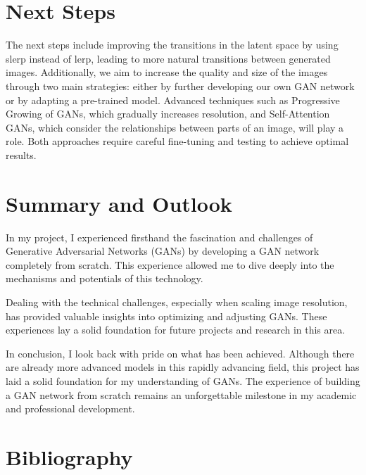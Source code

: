\documentclass[a4paper, 12pt]{article}
\begin{document}
\section{Next Steps}
The next steps include improving the transitions in the latent space by using slerp instead of lerp, leading to more natural transitions between generated images. Additionally, we aim to increase the quality and size of the images through two main strategies: either by further developing our own GAN network or by adapting a pre-trained model. Advanced techniques such as Progressive Growing of GANs, which gradually increases resolution, and Self-Attention GANs, which consider the relationships between parts of an image, will play a role. Both approaches require careful fine-tuning and testing to achieve optimal results.

\section{Summary and Outlook}
In my project, I experienced firsthand the fascination and challenges of Generative Adversarial Networks (GANs) by developing a GAN network completely from scratch. This experience allowed me to dive deeply into the mechanisms and potentials of this technology.

Dealing with the technical challenges, especially when scaling image resolution, has provided valuable insights into optimizing and adjusting GANs. These experiences lay a solid foundation for future projects and research in this area.

In conclusion, I look back with pride on what has been achieved. Although there are already more advanced models in this rapidly advancing field, this project has laid a solid foundation for my understanding of GANs. The experience of building a GAN network from scratch remains an unforgettable milestone in my academic and professional development.

\section{Bibliography}


\end{document}
